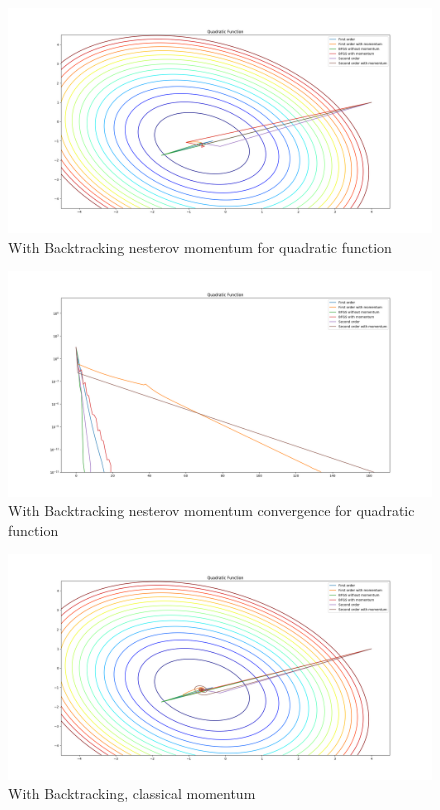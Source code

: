 \documentclass{article}
\begin{document}
\begin{figure}[H]
	\includegraphics[width=\linewidth]{../Images/quadraticnesterovbacktrack.png}
	\caption{With Backtracking nesterov momentum for quadratic function}
	\label{fig:With Backtracking nesterov momentum for quadratic function}
\end{figure}

\begin{figure}[H]
	\includegraphics[width=\linewidth]{../Images/quadraticnesterovbacktrack1.png}
	\caption{With Backtracking nesterov momentum convergence for quadratic function}
	\label{fig:With Backtracking nesterov momentum convergence for quadratic function}
\end{figure}

\begin{figure}[H]
	\includegraphics[width=\linewidth]{../Images/quadraticmomentumbacktrack.png}
	\caption{With Backtracking, classical momentum}
	\label{fig:With Backtracking, classical momentum for quadratic function}
\end{figure}
\end{document}

